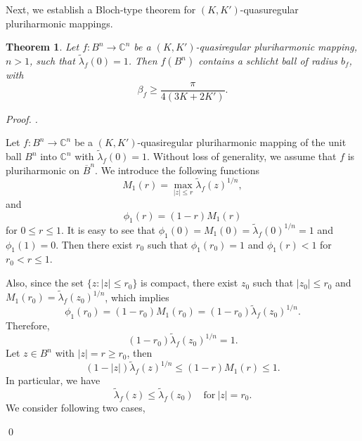 \documentclass[a4paper,12pt,reqno]{amsart}
\theoremstyle{plain}
\newtheorem{thm}{Theorem}
\theoremstyle{definition}
\newenvironment{pf}[1][]{%
	\vskip 3mm
	\noindent
	\ifthenelse{\equal{#1}{}}%
	{{\slshape Proof. }}%
	{{\slshape #1.} }%
}%
{\qed\bigskip}
\newcommand{\IC}{{\mathbb C}}
\numberwithin{equation}{section}
\begin{document}
Next, we establish a Bloch-type theorem for $(K,K')$-quasuregular pluriharmonic mappings.
\begin{thm}\label{Rohi-Vasu-P2-Theorem-004
}
Let $f: B^n \to \IC^n$ be a $(K,K')$-quasiregular pluriharmonic mapping, $n>1$, such that $\widetilde{\lambda}_f(0)=1$. Then $f(B^n)$ contains a schlicht ball of radius $b_f$, with
  $$\beta_f\geq \frac{\pi}{4(3K+2K')}.$$
\end{thm}
\begin{pf}
Let $f:B^n\to \IC^n$ be a $(K,K')$-quasiregular pluriharmonic mapping of the unit ball $B^n$ into $\IC^n$ with $\widetilde{\lambda}_f(0)=1$. Without loss of generality, we assume that $f$ is pluriharmonic on $\overline{B}^n$. We introduce the following functions 
$$M_1(r)=\max_{|z|\leq r}\widetilde{\lambda}_f(z)^{1/n},$$
and
$$\phi_1(r)=(1-r)M_1(r)$$
for $0\leq r\leq1.$
It is easy to see that $\phi_1(0)=M_1(0)=\widetilde{\lambda}_f(0)^{1/n}=1$ and $\phi_1(1)=0.$ Then there exist $r_0$ such that $\phi_1(r_0)=1$ and $\phi_1(r)<1$ for $r_0<r\leq1$. 
\vspace{2mm}

Also, since the set $\{z:|z|\leq r_0\}$ is compact, there exist $z_0$ such that $|z_0|\leq r_0$ and $ M_1(r_0)=\widetilde{\lambda}_f(z_0)^{1 / n}$, which implies
$$
\phi_1(r_0)=(1-r_0) M_1(r_0)=(1-r_0) \widetilde{\lambda}_f(z_0)^{1 / n}.
$$
Therefore,
\begin{equation}\label{Rohi-Vasu-P2-equation-011}
\left(1-r_0\right) \widetilde{\lambda}_f(z_0)^{1 / n}=1.
\end{equation}
Let $z\in B^n$ with $|z|=r \geq r_0$, then
\begin{equation}\label{Rohi-Vasu-P2-equation-011a}
(1-|z|)\widetilde{\lambda}_f(z)^{1/n}\leq (1-r)M_1(r)\leq 1.
\end{equation}  
In particular, we have
\begin{equation}\label{Rohi-Vasu-P2-equation-012}
\widetilde{\lambda}_f(z)\leq \widetilde{\lambda}_f(z_0) \quad\text{for} \ |z|=r_0.
\end{equation}
We consider following two cases,


\end{pf}
\end{document}
